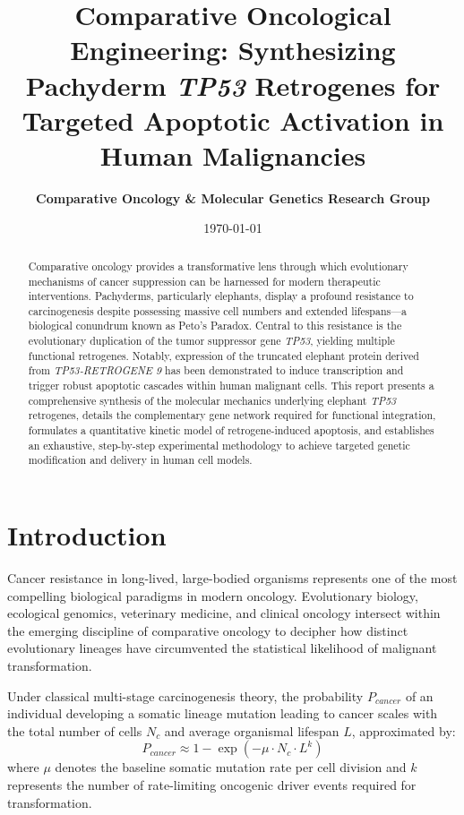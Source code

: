 \documentclass[12pt]{article}
\title{\textbf{Comparative Oncological Engineering: Synthesizing Pachyderm \textit{TP53} Retrogenes for Targeted Apoptotic Activation in Human Malignancies}}
\author{\textbf{Comparative Oncology \& Molecular Genetics Research Group}}
\date{\today}
\begin{document}
\maketitle

\begin{abstract}
Comparative oncology provides a transformative lens through which evolutionary mechanisms of cancer suppression can be harnessed for modern therapeutic interventions. Pachyderms, particularly elephants, display a profound resistance to carcinogenesis despite possessing massive cell numbers and extended lifespans—a biological conundrum known as Peto's Paradox. Central to this resistance is the evolutionary duplication of the tumor suppressor gene \textit{TP53}, yielding multiple functional retrogenes. Notably, expression of the truncated elephant protein derived from \textit{TP53-RETROGENE 9} has been demonstrated to induce transcription and trigger robust apoptotic cascades within human malignant cells. This report presents a comprehensive synthesis of the molecular mechanics underlying elephant \textit{TP53} retrogenes, details the complementary gene network required for functional integration, formulates a quantitative kinetic model of retrogene-induced apoptosis, and establishes an exhaustive, step-by-step experimental methodology to achieve targeted genetic modification and delivery in human cell models.
\end{abstract}

\section{Introduction}

Cancer resistance in long-lived, large-bodied organisms represents one of the most compelling biological paradigms in modern oncology. Evolutionary biology, ecological genomics, veterinary medicine, and clinical oncology intersect within the emerging discipline of comparative oncology to decipher how distinct evolutionary lineages have circumvented the statistical likelihood of malignant transformation. 

Under classical multi-stage carcinogenesis theory, the probability $P_{cancer}$ of an individual developing a somatic lineage mutation leading to cancer scales with the total number of cells $N_c$ and average organismal lifespan $L$, approximated by:
\begin{equation}
P_{cancer} \approx 1 - \exp\left( - \mu \cdot N_c \cdot L^k \right)
\end{equation}
where $\mu$ denotes the baseline somatic mutation rate per cell division and $k$ represents the number of rate-limiting oncogenic driver events required for transformation. 
\end{document}
